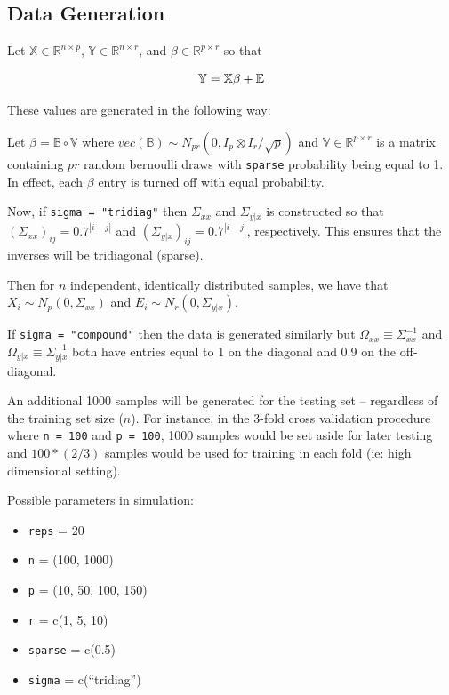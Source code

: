 \documentclass[11pt,]{report}
\providecommand{\tightlist}{%
  \setlength{\itemsep}{0pt}\setlength{\parskip}{0pt}}
\begin{document}
\hypertarget{data-generation}{%
\subsection{Data Generation}\label{data-generation}}

Let \(\mathbb{X} \in \mathbb{R}^{n \times p}\), \(\mathbb{Y} \in \mathbb{R}^{n \times r}\), and \(\beta \in \mathbb{R}^{p \times r}\) so that

\begin{equation}
\mathbb{Y} = \mathbb{X}\beta + \mathbb{E}
\label{eq:datalinregression}\notag
\end{equation}

These values are generated in the following way:

Let \(\beta = \mathbb{B} \circ \mathbb{V}\) where \(vec\left( \mathbb{B} \right) \sim N_{pr}\left( 0, I_{p} \otimes I_{r}/\sqrt{p} \right)\) and \(\mathbb{V} \in \mathbb{R}^{p \times r}\) is a matrix containing \(pr\) random bernoulli draws with \texttt{sparse} probability being equal to 1. In effect, each \(\beta\) entry is turned off with equal probability.

Now, if \texttt{sigma\ =\ "tridiag"} then \(\Sigma_{xx}\) and \(\Sigma_{y | x}\) is constructed so that \(\left( \Sigma_{xx} \right)_{ij} = 0.7^{\left| i - j \right|}\) and \(\left( \Sigma_{y | x} \right)_{ij} = 0.7^{\left| i - j \right|}\), respectively. This ensures that the inverses will be tridiagonal (sparse).

Then for \(n\) independent, identically distributed samples, we have that \(X_{i} \sim N_{p}\left( 0, \Sigma_{xx} \right)\) and \(E_{i} \sim N_{r}\left( 0, \Sigma_{y | x} \right)\).

If \texttt{sigma\ =\ "compound"} then the data is generated similarly but \(\Omega_{xx} \equiv \Sigma_{xx}^{-1}\) and \(\Omega_{y | x} \equiv \Sigma_{y | x}^{-1}\) both have entries equal to 1 on the diagonal and 0.9 on the off-diagonal.

An additional 1000 samples will be generated for the testing set -- regardless of the training set size (\(n\)). For instance, in the 3-fold cross validation procedure where \texttt{n\ =\ 100} and \texttt{p\ =\ 100}, 1000 samples would be set aside for later testing and \(100*(2/3)\) samples would be used for training in each fold (ie: high dimensional setting).

Possible parameters in simulation:

\begin{itemize}
\tightlist
\item
  \texttt{reps} = 20
\item
  \texttt{n} = (100, 1000)
\item
  \texttt{p} = (10, 50, 100, 150)
\item
  \texttt{r} = c(1, 5, 10)
\item
  \texttt{sparse} = c(0.5)
\item
  \texttt{sigma} = c(``tridiag'')
\end{itemize}
\end{document}
